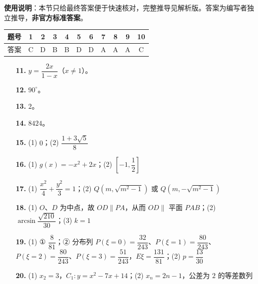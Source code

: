 
\begin{gknotice}
\textbf{使用说明}：本节只给最终答案便于快速核对，完整推导见解析版。答案为编写者独立推导，\textbf{非官方标准答案}。
\end{gknotice}

\begin{center}\begin{tabular}{ccccccccccc}
\toprule
题号 & 1 & 2 & 3 & 4 & 5 & 6 & 7 & 8 & 9 & 10 \\
\midrule
答案 & C & D & B & B & D & D & A & A & A & C \\
\bottomrule
\end{tabular}\end{center}

\begin{itemize}[leftmargin=2.6em]
  \item[\textbf{11.}] $y = \dfrac{2x}{1 - x}$（$x \neq 1$）。
  \item[\textbf{12.}] $90^\circ$。
  \item[\textbf{13.}] $2$。
  \item[\textbf{14.}] $8424$。
\end{itemize}

\begin{itemize}[leftmargin=2.6em]
  \item[\textbf{15.}] (1) $0$；(2) $\dfrac{1 + 3\sqrt{5}}{8}$
  \item[\textbf{16.}] (1) $g(x) = -x^2 + 2x$；(2) $\left[-1, \dfrac{1}{2}\right]$
  \item[\textbf{17.}] (1) $\dfrac{x^2}{4} + \dfrac{y^2}{3} = 1$；(2) $Q\left(m, \sqrt{m^2 - 1}\right)$ 或 $Q\left(m, -\sqrt{m^2 - 1}\right)$
  \item[\textbf{18.}] (1) $O$、$D$ 为中点，故 $OD \parallel PA$，从而 $OD \parallel$ 平面 $PAB$；(2) $\arcsin\dfrac{\sqrt{210}}{30}$；(3) $k = 1$
  \item[\textbf{19.}] (1) ① $\dfrac{8}{81}$；② 分布列 $P(\xi = 0) = \dfrac{32}{243}$、$P(\xi = 1) = \dfrac{80}{243}$、$P(\xi = 2) = \dfrac{80}{243}$、$P(\xi = 3) = \dfrac{51}{243}$，$E\xi = \dfrac{131}{81}$；(2) $p = \dfrac{13}{30}$
  \item[\textbf{20.}] (1) $x_2 = 3$，$C_1: y = x^2 - 7x + 14$；(2) $x_n = 2n - 1$，公差为 $2$ 的等差数列
\end{itemize}
